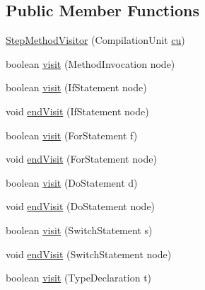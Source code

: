 \subsection*{Public Member Functions}
\begin{DoxyCompactItemize}
\item 
\hyperlink{classit_1_1isislab_1_1masonhelperdocumentation_1_1visitor_1_1_step_method_visitor_adddca67b82cf8c0c1002a4a6ecfe33df}{Step\-Method\-Visitor} (Compilation\-Unit \hyperlink{classit_1_1isislab_1_1masonhelperdocumentation_1_1visitor_1_1_step_method_visitor_a2e892060825ccd1ba2382eb96b6d187a}{cu})
\item 
boolean \hyperlink{classit_1_1isislab_1_1masonhelperdocumentation_1_1visitor_1_1_step_method_visitor_a5ec8cf0c38db7e8a67defaaf8bea6819}{visit} (Method\-Invocation node)
\item 
boolean \hyperlink{classit_1_1isislab_1_1masonhelperdocumentation_1_1visitor_1_1_step_method_visitor_ae285b7e4c880f018608b61723780fcd5}{visit} (If\-Statement node)
\item 
void \hyperlink{classit_1_1isislab_1_1masonhelperdocumentation_1_1visitor_1_1_step_method_visitor_a5313944f37778c839790b7c674adeea4}{end\-Visit} (If\-Statement node)
\item 
boolean \hyperlink{classit_1_1isislab_1_1masonhelperdocumentation_1_1visitor_1_1_step_method_visitor_ae21ddeed1e6955db2615168166e76a08}{visit} (For\-Statement f)
\item 
void \hyperlink{classit_1_1isislab_1_1masonhelperdocumentation_1_1visitor_1_1_step_method_visitor_a0366b9fbfc28b532e11772dba62051af}{end\-Visit} (For\-Statement node)
\item 
boolean \hyperlink{classit_1_1isislab_1_1masonhelperdocumentation_1_1visitor_1_1_step_method_visitor_ae1478cadceb4cafe85f16119cb6ce519}{visit} (Do\-Statement d)
\item 
void \hyperlink{classit_1_1isislab_1_1masonhelperdocumentation_1_1visitor_1_1_step_method_visitor_ae08cc0555f71824886f96df4bd03ad8f}{end\-Visit} (Do\-Statement node)
\item 
boolean \hyperlink{classit_1_1isislab_1_1masonhelperdocumentation_1_1visitor_1_1_step_method_visitor_a9b66a4e882bed012a5a9f041f10d1b2b}{visit} (Switch\-Statement s)
\item 
void \hyperlink{classit_1_1isislab_1_1masonhelperdocumentation_1_1visitor_1_1_step_method_visitor_a1ffd4cf48912dc0208946e5b5c296363}{end\-Visit} (Switch\-Statement node)
\item 
boolean \hyperlink{classit_1_1isislab_1_1masonhelperdocumentation_1_1visitor_1_1_step_method_visitor_a25037af01b78ecfd578dd2465682ed03}{visit} (Type\-Declaration t)

\end{DoxyCompactItemize}

